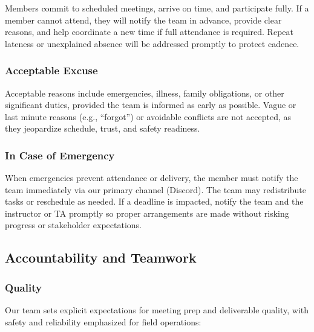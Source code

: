 \documentclass{article}
\begin{document}
\subsubsection*{\color{blue}{Expectations}}

Members commit to scheduled meetings, arrive on time, and participate fully. If
a member cannot attend, they will notify the team in advance, provide clear
reasons, and help coordinate a new time if full attendance is required. Repeat
lateness or unexplained absence will be addressed promptly to protect cadence.

\subsubsection*{\color{blue}Acceptable Excuse}

Acceptable reasons include emergencies, illness, family obligations, or other
significant duties, provided the team is informed as early as possible. Vague
or last minute reasons (e.g., ``forgot'') or avoidable conflicts are not
accepted, as they jeopardize schedule, trust, and safety readiness.

\subsubsection*{\color{blue}In Case of Emergency}

When emergencies prevent attendance or delivery, the member must notify the
team immediately via our primary channel (Discord). The team may redistribute
tasks or reschedule as needed. If a deadline is impacted, notify the team and
the instructor or TA promptly so proper arrangements are made without risking
progress or stakeholder expectations.
\subsection*{Accountability and Teamwork}

\subsubsection*{\color{blue}Quality}

Our team sets explicit expectations for meeting prep and deliverable quality,
with safety and reliability emphasized for field operations:
\end{document}
